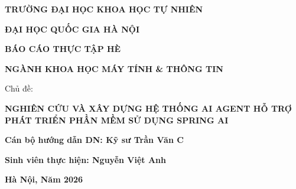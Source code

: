 \documentclass[12pt,a4paper]{report}
\begin{document}
\begin{titlepage}
    \centering 
    
    {\fontsize{14pt}{17pt}\selectfont \bfseries TRƯỜNG ĐẠI HỌC KHOA HỌC TỰ NHIÊN\par}
    \vspace{0.25cm}
    {\fontsize{14pt}{17pt}\selectfont \bfseries ĐẠI HỌC QUỐC GIA HÀ NỘI\par}
    
    \vfill 
    \vspace{0.5cm}
    
    \vspace{0.75cm}
    
    {\fontsize{16pt}{19pt}\selectfont \bfseries BÁO CÁO THỰC TẬP HÈ\par}
    \vspace{0.25cm}
    
    {\fontsize{20pt}{24pt}\selectfont \bfseries NGÀNH KHOA HỌC MÁY TÍNH \& THÔNG TIN\par} 
    
    \vspace{0.75cm}
    
    {\fontsize{14pt}{17pt}\selectfont \bfseries \raggedright Chủ đề:\par}
    \vspace{0.25cm}
    
    {\fontsize{18pt}{22pt}\selectfont \bfseries NGHIÊN CỨU VÀ XÂY DỰNG HỆ THỐNG AI AGENT HỖ TRỢ PHÁT TRIỂN PHẦN MỀM SỬ DỤNG SPRING AI\par}
    
    \vfill
    
    \vspace{0.5cm}
    \begin{minipage}{0.9\textwidth} 
        \raggedright 

        {\fontsize{12pt}{15pt}\selectfont \bfseries Cán bộ hướng dẫn DN: Kỹ sư Trần Văn C \par}
        \vspace{0.25cm}
        
        {\fontsize{12pt}{15pt}\selectfont \bfseries Sinh viên thực hiện: Nguyễn Việt Anh\par}
        \vspace{0.25cm}
        
    \end{minipage}
    
    \vspace{1cm} 
    
    {\fontsize{12pt}{15pt}\selectfont \bfseries Hà Nội, Năm 2026\par}

    
\end{titlepage}
\end{document}
